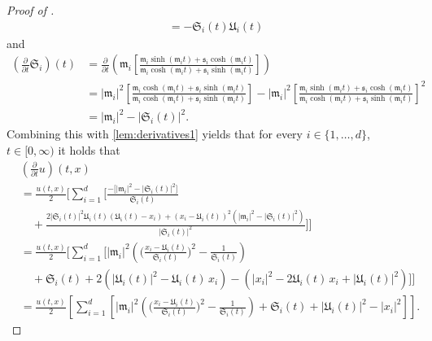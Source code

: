 \begin{proof}[Proof of ]
\begin{equation}
\begin{aligned}
			&= - \mathfrak{S}_i(t)    \mathfrak{U}_i(t) 
		\end{aligned}
	\end{equation}
	and
	\begin{equation}
		\begin{aligned}
			(\tfrac{\partial }{\partial t}\mathfrak{S}_i)(t) &= \frac{\partial }{\partial t} \left( \mathfrak{m}_i \left[ \frac{\mathfrak{m}_i \sinh(\mathfrak{m}_i  t) + \mathfrak{s}_i \cosh(\mathfrak{m}_i t)}{\mathfrak{m}_i \cosh(\mathfrak{m}_i  t) + \mathfrak{s}_i \sinh(\mathfrak{m}_i t)}\right]\right) \\
			&= |\mathfrak{m}_i|^2 \left[ \frac{\mathfrak{m}_i \cosh(\mathfrak{m}_i  t) + \mathfrak{s}_i \sinh(\mathfrak{m}_i t)}{\mathfrak{m}_i \cosh(\mathfrak{m}_i  t) + \mathfrak{s}_i \sinh(\mathfrak{m}_i t)}\right] - |\mathfrak{m}_i|^2\left[ \frac{\mathfrak{m}_i \sinh(\mathfrak{m}_i  t) + \mathfrak{s}_i \cosh(\mathfrak{m}_i t)}{ \mathfrak{m}_i \cosh(\mathfrak{m}_i  t) + \mathfrak{s}_i \sinh(\mathfrak{m}_i t)} \right]^2\\
			&= |\mathfrak{m}_i|^2  - |\mathfrak{S}_i(t)|^2.
		\end{aligned}
	\end{equation}
	Combining this with \eqref{lem:derivatives1} yields that for every
	$i \in \{1, \dots,d\}$,
	$t \in [0,\infty)$
	it holds that
	\begin{equation}\label{lem:derivatives1*}
		\begin{split}
				&(\tfrac{\partial }{\partial t}u) (t,x)  \\
				&= \frac{u(t,x)}{2} \Bigg[ \sum_{i=1}^d\Bigg[ \frac{-\big[|\mathfrak{m}_i|^2  - |\mathfrak{S}_i(t)|^2\big]}{\mathfrak{S}_i(t)} \\
				&\quad + \frac{ 2|\mathfrak{S}_i(t)|^2  \mathfrak{U}_i(t) (\mathfrak{U_i}(t) - x_i) + (x_i-\mathfrak{U}_i(t))^2 (|\mathfrak{m}_i|^2  - |\mathfrak{S}_i(t)|^2)}{|\mathfrak{S}_i(t)|^{2}}\Bigg] \Bigg]\\
				&= \frac{u(t,x)}{2} \Bigg[ \sum_{i=1}^d\Bigg[ |\mathfrak{m}_i|^2  \left( \bigg(\frac{x_i - \mathfrak{U}_i(t)}{\mathfrak{S}_i(t)}\bigg)^{\!2} - \frac{1}{\mathfrak{S}_i(t)} \right) \\
				&\quad + \mathfrak{S}_i(t) + 2\left(|\mathfrak{U}_i(t)|^2 - \mathfrak{U}_i(t)\, x_i\right) - \left(|x_i|^2 -2 \mathfrak{U}_i(t) \, x_i + |\mathfrak{U}_i(t)|^2 \right)  \Bigg] \Bigg]\\
				&= \frac{u(t,x)}{2} \left[ \sum_{i=1}^d \left[  |\mathfrak{m}_i|^2  \left( \bigg(\frac{x_i - \mathfrak{U}_i(t)}{\mathfrak{S}_i(t)}\bigg)^{\!2} - \frac{1}{\mathfrak{S}_i(t)} \right) + \mathfrak{S}_i(t) + |\mathfrak{U}_i(t)|^2 - |x_i|^2 \right]\right].

\end{split}
\end{equation}
\end{proof}

